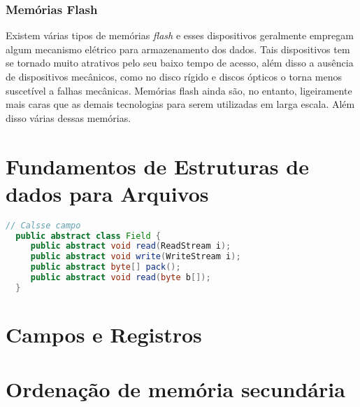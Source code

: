 \documentclass[a4paper,11pt]{book}
\begin{document}
   \subsection{Memórias Flash}
       Existem várias tipos de memórias \emph{flash} e esses dispositivos geralmente empregam algum mecanismo elétrico para armazenamento
       dos dados. Tais dispositivos tem se tornado muito atrativos pelo seu baixo tempo de acesso, além disso a ausência de dispositivos 
       mecânicos, como no disco rígido e discos ópticos o torna menos suscetível a falhas mecânicas. Memórias flash ainda são, no entanto, 
       ligeiramente mais caras que as demais tecnologias para serem utilizadas em larga escala. Além disso várias dessas memórias. 
      
  


   
\chapter{Fundamentos de Estruturas de dados para Arquivos}

\begin{lstlisting}[language=java,caption=Calsse java para campo]
  // Calsse campo
  public abstract class Field {
     public abstract void read(ReadStream i); 
     public abstract void write(WriteStream i); 
     public abstract byte[] pack(); 
     public abstract void read(byte b[]); 
  }
\end{lstlisting}



\chapter{Campos e Registros}


\chapter{Ordenação de memória secundária}
\end{document}
